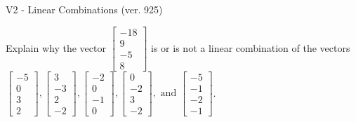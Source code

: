 \begin{exercise}
  \begin{exerciseTitle}V2 - Linear Combinations (ver. 925)\end{exerciseTitle}
  \begin{exerciseStatement}
    Explain why the vector \(\left[\begin{array}{c}
-18 \\
9 \\
-5 \\
8
\end{array}\right]\)  is or is not a linear 
	combination of the vectors \(\left[\begin{array}{c}
-5 \\
0 \\
3 \\
2
\end{array}\right] , \left[\begin{array}{c}
3 \\
-3 \\
2 \\
-2
\end{array}\right] , \left[\begin{array}{c}
-2 \\
0 \\
-1 \\
0
\end{array}\right] , \left[\begin{array}{c}
0 \\
-2 \\
3 \\
-2
\end{array}\right] , \text{ and } \left[\begin{array}{c}
-5 \\
-1 \\
-2 \\
-1
\end{array}\right]\).
	



\end{exerciseStatement}
\end{exercise}
